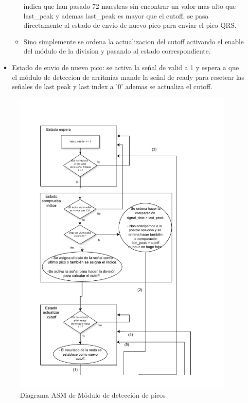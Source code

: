\begin{itemize}
\begin{itemize}
         indica que han pasado 72 muestras sin encontrar un valor mas alto que last\_peak y ademas last\_peak es mayor que el cutoff, se pasa directamente al estado
         de envio de nuevo pico para enviar el pico QRS.
        \item Sino simplemente se ordena la actualizacion del cutoff activando el enable del módulo de la division y pasando al estado correspondiente.
    \end{itemize}
    \item Estado de envio de nuevo pico: se activa la señal de valid a 1 y espera a que el módulo de deteccion de arritmias mande la señal de ready para resetear 
    las señales de last peak y last index a '0' ademas se actualiza el cutoff.
\end{itemize}

\begin{figure}[h!]
    \centering
    \includegraphics[width=0.99\textwidth]{./Images/img_implementacion_hw/Diagramaasmpicos1.pdf}
    \caption{Diagrama ASM de Módulo de detección de picos}
    \label{fig:Diagramaasmpicos1}
\end{figure} 

